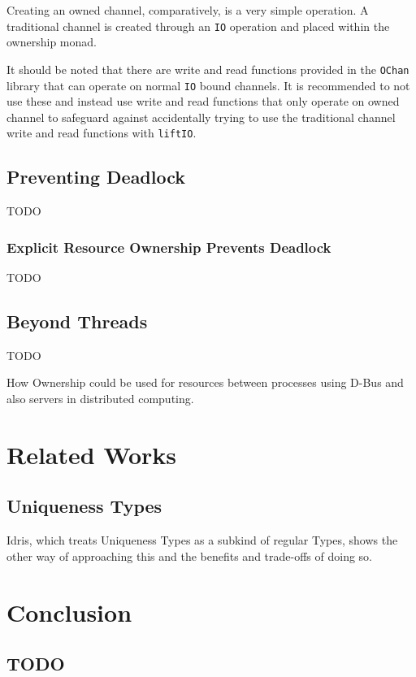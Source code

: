 \documentclass[onehalf,11pt]{beavtex}
\begin{document}
Creating an owned channel, comparatively, is a very simple operation.
A traditional channel is created through an \texttt{IO} operation and placed
within the ownership monad.

It should be noted that there are write and read functions provided
in the \texttt{OChan} library that can operate on normal \texttt{IO} bound
channels.  It is recommended to not use these and instead use write and read
functions that only operate on owned channel to safeguard against
accidentally trying to use the traditional channel write and read functions
with \texttt{liftIO}.

\section{Preventing Deadlock}
TODO

\subsection{Explicit Resource Ownership Prevents Deadlock}
TODO

\section{Beyond Threads}

TODO

How Ownership could be used for resources between processes using D-Bus and also
servers in distributed computing.

\chapter{Related Works}

\section{Uniqueness Types}

Idris, which treats Uniqueness Types as a subkind of regular Types, shows
the other way of approaching this and the benefits and trade-offs of doing so.



\chapter{Conclusion}
\section{TODO}


{}

\end{document}
